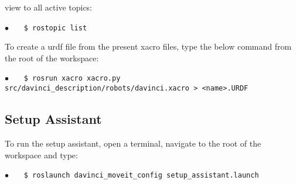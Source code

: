 view to all active topics:

\hspace{1cm} \textbf{$\bullet$} \ \ \  \texttt{\$ rostopic list} \ \ \ {} 

To create a \gls{urdf} file from the present xacro files, type the below command from the root of the workspace:

\hspace{1cm} \textbf{$\bullet$} \ \ \  \texttt{\$ rosrun xacro xacro.py src/davinci\_description/robots/davinci.xacro > <name>.URDF} %
%
\subsection*{Setup Assistant}
To run the setup assistant, open a terminal, navigate to the root of the workspace and type:

\hspace{1cm} \textbf{$\bullet$} \ \ \  \texttt{\$ roslaunch davinci\_moveit\_config setup\_assistant.launch} \ \ \ {} 

